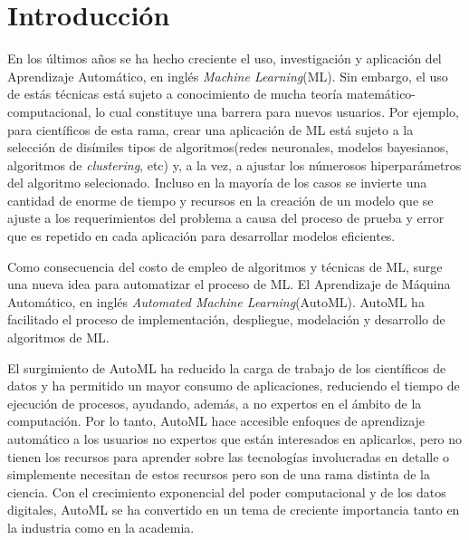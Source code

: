 \chapter*{Introducción}\label{chapter:introduction}

En los últimos años se ha hecho creciente el uso, investigación y aplicación
del Aprendizaje Automático, en inglés \emph{Machine Learning}(ML). Sin embargo,
el uso de estás técnicas está sujeto a conocimiento de mucha teoría
matemático-computacional, lo cual constituye una barrera para nuevos usuarios.
Por ejemplo, para científicos de esta rama, crear una aplicación de ML está
sujeto a la selección de disímiles tipos de algoritmos(redes neuronales,
modelos bayesianos, algoritmos de \emph{clustering}, etc) y, a la vez, a
ajustar los númerosos hiperparámetros del algoritmo selecionado. Incluso en la
mayoría de los casos se invierte una cantidad de enorme de tiempo y recursos en
la creación de un modelo que se ajuste a los requerimientos del problema a
causa del proceso de prueba y error que es repetido en cada aplicación para
desarrollar modelos eficientes.

Como consecuencia del costo de empleo de algoritmos y técnicas de ML, surge una
nueva idea para automatizar el proceso de ML. El Aprendizaje de Máquina
Automático, en inglés \emph{Automated Machine Learning}(AutoML). AutoML ha
facilitado el proceso de implementación, despliegue, modelación y desarrollo de
algoritmos de ML.

El surgimiento de AutoML ha reducido la carga de trabajo de los científicos de
datos y ha permitido un mayor consumo de aplicaciones, reduciendo el tiempo de
ejecución de procesos, ayudando, además, a no expertos en el ámbito de la
computación. Por lo tanto, AutoML hace accesible enfoques de aprendizaje
automático a los usuarios no expertos que están interesados en aplicarlos,
pero no tienen los recursos para aprender sobre las tecnologías involucradas
en detalle o simplemente necesitan de estos recursos pero son de una rama
distinta de la ciencia. Con el crecimiento exponencial del poder computacional
y de los datos digitales, AutoML se ha convertido en un tema de creciente
importancia tanto en la industria como en la academia.

